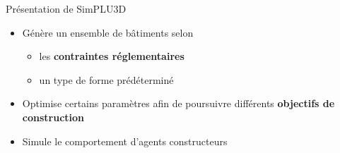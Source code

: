 \documentclass[xcolor=table]{beamer}
\begin{document}
\begin{frame}{Présentation de SimPLU3D}
	\begin{itemize}
		\item Génère un ensemble de bâtiments selon
		\begin{itemize}
			\item les \textbf{contraintes réglementaires}
			\item un type de forme prédéterminé
		\end{itemize}
		\item Optimise certains paramètres afin de poursuivre différents \textbf{objectifs de construction}
		\item Simule le comportement d'agents constructeurs
	\end{itemize} 
\end{frame}
\end{document}
